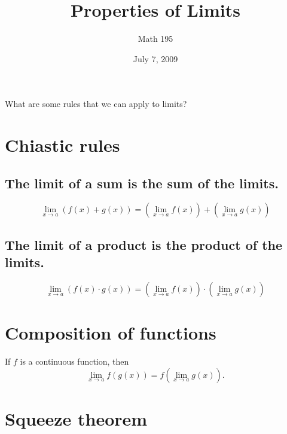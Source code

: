 \documentclass[12pt]{article}
\title{Properties of Limits}
\author{Math 195}
\date{July 7, 2009}
\begin{document}
\maketitle

What are some rules that we can apply to limits?

\section{Chiastic rules}

\subsection{The limit of a sum is the sum of the limits.}

$$
\lim_{x \to a} \left( f(x) + g(x) \right) = 
\left( \lim_{x \to a} f(x)  \right)
+ \left( \lim_{x \to a} g(x) \right)
$$

\subsection{The limit of a product is the product of the limits.}

$$
\lim_{x \to a} \left( f(x) \cdot g(x) \right) = 
\left( \lim_{x \to a} f(x)  \right)
\cdot \left( \lim_{x \to a} g(x) \right)
$$

\section{Composition of functions}

If $f$ is a continuous function, then
$$
\lim_{x \to a} f(g(x)) = 
f \left( \lim_{x \to a} g(x)\right).
$$

\section{Squeeze theorem}
\end{document}
